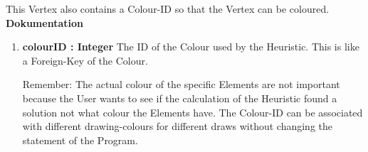 				This Vertex also contains a Colour-ID so that the Vertex can be coloured.
				\textbf{Dokumentation}\newline
				\begin{enumerate}[-]
					\item{
						\textbf{colourID : Integer} \newline
						The ID of the Colour used by the Heuristic.
						This is like a Foreign-Key of the Colour.
						
						Remember:
						The actual colour of the specific Elements are not important because the User wants to see if the calculation of the Heuristic found a solution not what colour the Elements have.
						The Colour-ID can be associated with different drawing-colours for different draws without changing the statement of the Program.
					}
				\end{enumerate}	
